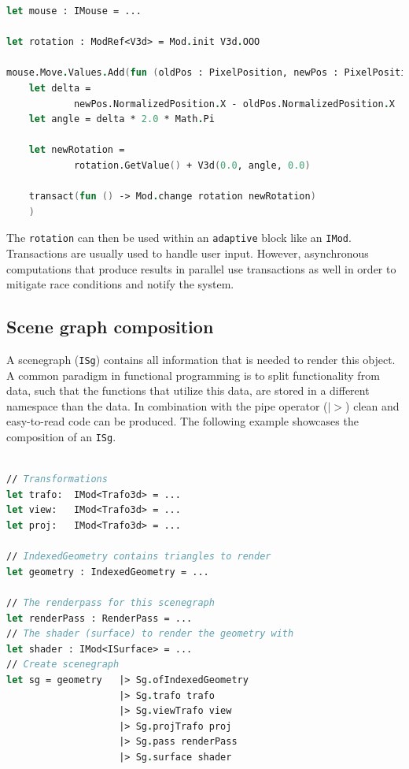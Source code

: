 \begin{lstlisting}[language = FSharp]
let mouse : IMouse = ...

let rotation : ModRef<V3d> = Mod.init V3d.OOO

mouse.Move.Values.Add(fun (oldPos : PixelPosition, newPos : PixelPosition) -> 
    let delta = 
			newPos.NormalizedPosition.X - oldPos.NormalizedPosition.X
    let angle = delta * 2.0 * Math.Pi
    
    let newRotation = 
			rotation.GetValue() + V3d(0.0, angle, 0.0)
    
    transact(fun () -> Mod.change rotation newRotation)
    )
\end{lstlisting}

The \verb|rotation| can then be used within an \verb|adaptive| block like an \verb|IMod|. 
\\
Transactions are usually used to handle user input. However, asynchronous computations that produce results in parallel use transactions as well in order to mitigate race conditions and notify the system. 


\subsection{Scene graph composition}
\label{sec:isg}

A scenegraph (\verb|ISg|) contains all information that is needed to render this object. A common paradigm in functional programming is to split functionality from data, such that the functions that utilize this data, are stored in a different namespace than the data. In combination with the pipe operator ($|>$) clean and easy-to-read code can be produced. The following example showcases the composition of an \verb|ISg|. 

\begin{lstlisting}[language = FSharp]

// Transformations
let trafo:	IMod<Trafo3d> = ... 
let view:	IMod<Trafo3d> = ...
let proj:	IMod<Trafo3d> = ...

// IndexedGeometry contains triangles to render
let geometry : IndexedGeometry = ...

// The renderpass for this scenegraph
let renderPass : RenderPass = ...
// The shader (surface) to render the geometry with
let shader : IMod<ISurface> = ...
// Create scenegraph
let sg = geometry	|> Sg.ofIndexedGeometry
                    |> Sg.trafo trafo
                    |> Sg.viewTrafo view
                    |> Sg.projTrafo proj
                    |> Sg.pass renderPass
                    |> Sg.surface shader
\end{lstlisting}

